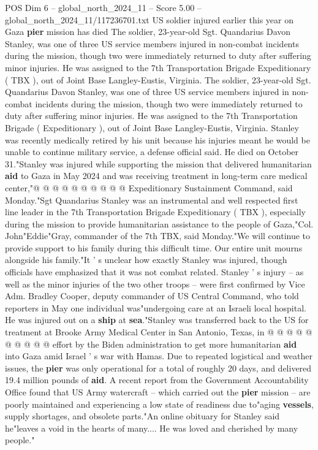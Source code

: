 \begin{textsample}{POS Dim 6 – global\_north\_2024\_11 – Score 5.00 – global\_north\_2024\_11/117236701.txt}  \label{ex:f6_pos_286}
US soldier injured earlier this year on Gaza \textbf{pier} mission has died The soldier, 23-year-old Sgt.
Quandarius Davon Stanley, was one of three US service members injured in non-combat incidents during the mission, though two were immediately returned to duty after suffering minor injuries.
He was assigned to the 7th Transportation Brigade Expeditionary ( TBX ), out of Joint Base Langley-Eustis, Virginia.
The soldier, 23-year-old Sgt.
Quandarius Davon Stanley, was one of three US service members injured in non-combat incidents during the mission, though two were immediately returned to duty after suffering minor injuries.
He was assigned to the 7th Transportation Brigade ( Expeditionary ), out of Joint Base Langley-Eustis, Virginia.
Stanley was recently medically retired by his unit because his injuries meant he would be unable to continue military service, a defense official said.
He died on October 31."Stanley was injured while supporting the mission that delivered humanitarian \textbf{aid} to Gaza in May 2024 and was receiving treatment in long-term care medical center,"@ @ @ @ @ @ @ @ @ @ Expeditionary Sustainment Command, said Monday."Sgt Quandarius Stanley was an instrumental and well respected first line leader in the 7th Transportation Brigade Expeditionary ( TBX ), especially during the mission to provide humanitarian assistance to the people of Gaza,"Col.
John"Eddie"Gray, commander of the 7th TBX, said Monday."We will continue to provide support to his family during this difficult time.
Our entire unit mourns alongside his family."It ' s unclear how exactly Stanley was injured, though officials have emphasized that it was not combat related.
Stanley ' s injury -- as well as the minor injuries of the two other troops -- were first confirmed by Vice Adm.
Bradley Cooper, deputy commander of US Central Command, who told reporters in May one individual was"undergoing care at an Israeli local hospital.
He was injured out on a \textbf{ship} at \textbf{sea}."Stanley was transferred back to the US for treatment at Brooke Army Medical Center in San Antonio, Texas, in @ @ @ @ @ @ @ @ @ @ effort by the Biden administration to get more humanitarian \textbf{aid} into Gaza amid Israel ' s war with Hamas.
Due to repeated logistical and weather issues, the \textbf{pier} was only operational for a total of roughly 20 days, and delivered 19.4 million pounds of \textbf{aid}.
A recent report from the Government Accountability Office found that US Army watercraft -- which carried out the \textbf{pier} mission -- are poorly maintained and experiencing a low state of readiness due to"aging \textbf{vessels}, supply shortages, and obsolete parts."An online obituary for Stanley said he"leaves a void in the hearts of many....
He was loved and cherished by many people."

\end{textsample}
